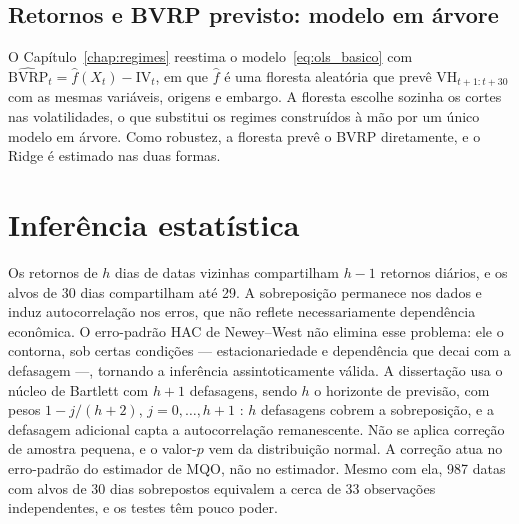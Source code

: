 \subsection{Retornos e BVRP previsto: modelo em árvore}

O Capítulo~\ref{chap:regimes} reestima o modelo~\eqref{eq:ols_basico} com
$\widehat{\text{BVRP}}_t = \hat{f}(X_t) - \text{IV}_t$, em que $\hat{f}$ é uma
floresta aleatória que prevê $\text{VH}_{t+1:t+30}$ com as mesmas variáveis,
origens e embargo. A floresta escolhe sozinha os cortes nas volatilidades, o
que substitui os regimes construídos à mão por um único modelo em árvore. Como
robustez, a floresta prevê o BVRP diretamente, e o Ridge é estimado nas duas
formas.

\section{Inferência estatística}
\label{sec:inferencia}

Os retornos de $h$ dias de datas vizinhas compartilham $h-1$ retornos diários,
e os alvos de 30 dias compartilham até 29. A sobreposição permanece nos dados e
induz autocorrelação nos erros, que não reflete necessariamente dependência
econômica. O erro-padrão HAC de Newey--West não elimina esse problema: ele o
contorna, sob certas condições --- estacionariedade e dependência que decai com
a defasagem ---, tornando a inferência assintoticamente válida. A dissertação
usa o núcleo de Bartlett com $h+1$ defasagens, sendo $h$ o horizonte de
previsão, com pesos $1 - j/(h+2)$, $j = 0, \ldots, h+1$
\citep{newey1987simple}: $h$ defasagens cobrem a sobreposição, e a defasagem
adicional capta a autocorrelação remanescente. Não se aplica correção de
amostra pequena, e o valor-$p$ vem da distribuição normal. A correção atua no
erro-padrão do estimador de MQO, não no estimador. Mesmo com ela, 987 datas com
alvos de 30 dias sobrepostos equivalem a cerca de 33 observações
independentes, e os testes têm pouco poder.


